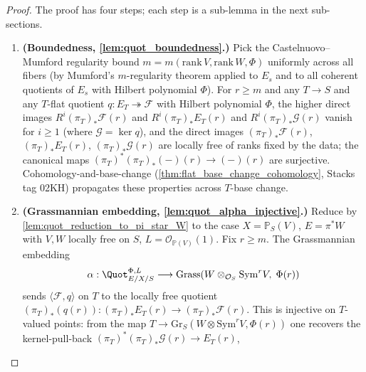 \begin{proof}

  The proof has four steps; each step is a sub-lemma in the next
  sub-sections.
  \begin{enumerate}
    \item \textbf{(Boundedness, \cref{lem:quot_boundedness}.)} Pick the
      Castelnuovo--Mumford regularity bound \(m = m(\mathrm{rank}\,V,
      \mathrm{rank}\,W, \Phi)\) uniformly across all fibers (by Mumford's
      \(m\)-regularity theorem applied to \(E_s\) and to all coherent
      quotients of \(E_s\) with Hilbert polynomial \(\Phi\)). For \(r \ge m\)
      and any \(T \to S\) and any \(T\)-flat quotient
      \(q : E_T \twoheadrightarrow \mathcal{F}\) with Hilbert polynomial
      \(\Phi\), the higher direct images \(R^i (\pi_T)_* \mathcal{F}(r)\)
      and \(R^i (\pi_T)_* E_T(r)\) and \(R^i (\pi_T)_* \mathcal{G}(r)\)
      vanish for \(i \ge 1\) (where \(\mathcal{G} = \ker q\)), and the
      direct images \((\pi_T)_* \mathcal{F}(r)\), \((\pi_T)_* E_T(r)\),
      \((\pi_T)_* \mathcal{G}(r)\) are locally free of ranks fixed by the
      data; the canonical maps \((\pi_T)^* (\pi_T)_*(-)(r) \to (-)(r)\)
      are surjective. Cohomology-and-base-change (\cref{thm:flat_base_change_cohomology},
      Stacks tag 02KH) propagates these properties across \(T\)-base change.
    \item \textbf{(Grassmannian embedding, \cref{lem:quot_alpha_injective}.)}
      Reduce by \cref{lem:quot_reduction_to_pi_star_W} to the case
      \(X = \mathbb{P}_S(V)\), \(E = \pi^* W\) with \(V, W\) locally free
      on \(S\), \(L = \mathcal{O}_{\mathbb{P}(V)}(1)\). Fix \(r \ge m\).
      The Grassmannian embedding
      \[
        \alpha : \Quot^{\Phi,L}_{E/X/S} \longrightarrow
        \mathrm{Grass}\!\left(
          W \otimes_{\mathcal{O}_S} \mathrm{Sym}^r V,\; \Phi(r)
        \right)
      \]
      sends \(\langle \mathcal{F}, q\rangle\) on \(T\) to the locally free
      quotient \((\pi_T)_*(q(r)) : (\pi_T)_* E_T(r) \to (\pi_T)_* \mathcal{F}(r)\).
      This is injective on \(T\)-valued points: from the map \(T \to
      \mathrm{Gr}_S(W \otimes \mathrm{Sym}^r V, \Phi(r))\) one recovers
      the kernel-pull-back \((\pi_T)^* (\pi_T)_* \mathcal{G}(r) \to E_T(r)\),

\end{enumerate}
\end{proof}
